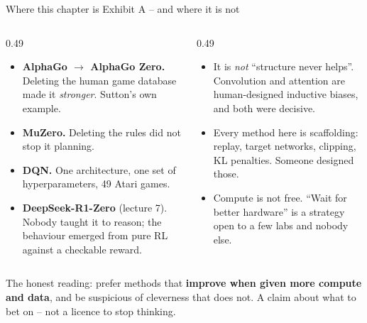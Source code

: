 \documentclass[aspectratio=169]{beamer}
\begin{document}
\begin{frame}{Where this chapter is Exhibit A -- and where it is not}
  \begin{columns}[T]
    \begin{column}{0.49\textwidth}
      \begin{tcolorbox}[colback=paramgreen!8, colframe=paramgreen, boxrule=0.6pt, arc=2pt,
                        title={\textbf{Evidence for}}]
        \scriptsize
        \begin{itemize}\itemsep2pt
          \item \textbf{AlphaGo $\to$ AlphaGo Zero.} Deleting the human game database made it
                \emph{stronger}. Sutton's own example.
          \item \textbf{MuZero.} Deleting the rules did not stop it planning.
          \item \textbf{DQN.} One architecture, one set of hyperparameters, 49 Atari games.
          \item \textbf{DeepSeek-R1-Zero} (lecture 7). Nobody taught it to reason; the behaviour
                emerged from pure RL against a checkable reward.
        \end{itemize}
      \end{tcolorbox}
    \end{column}
    \begin{column}{0.49\textwidth}
      \begin{tcolorbox}[colback=armorange!12, colframe=armorange, boxrule=0.6pt, arc=2pt,
                        title={\textbf{Read it carefully, though}}]
        \scriptsize
        \begin{itemize}\itemsep2pt
          \item It is \emph{not} ``structure never helps''. Convolution and attention are
                human-designed inductive biases, and both were decisive.
          \item Every method here is scaffolding: replay, target networks, clipping, KL
                penalties. Someone designed those.
          \item Compute is not free. ``Wait for better hardware'' is a strategy open to a few
                labs and nobody else.
        \end{itemize}
      \end{tcolorbox}
    \end{column}
  \end{columns}

  \vskip 5pt
  \begin{tcolorbox}[colback=lightbg, colframe=popblue, boxrule=0.6pt, arc=2pt]
    \scriptsize
    The honest reading: prefer methods that \textbf{improve when given more compute and data},
    and be suspicious of cleverness that does not. A claim about what to bet on -- not a licence
    to stop thinking.
  \end{tcolorbox}
\end{frame}
\end{document}

